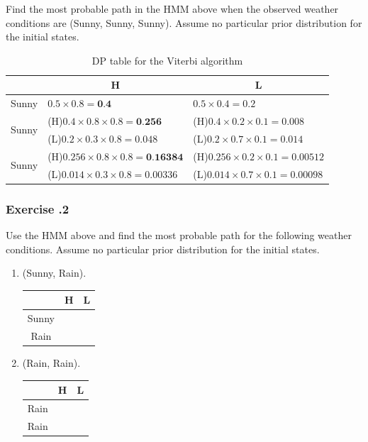 Find the most probable path in the HMM above when the observed weather conditions are (Sunny, Sunny, Sunny). Assume no particular prior distribution for the initial states.

\begin{table}[H]
\centering
\caption{DP table for the Viterbi algorithm}
\label{my-label}
\begin{tabular}{|c|l|l|}
\hline
                       & \multicolumn{1}{c|}{H}     & \multicolumn{1}{c|}{L}     \\ \hline
Sunny                  & $0.5 \times 0.8 = \textbf{0.4}$              & $0.5 \times 0.4 = 0.2$              \\ \hline
\multirow{2}{*}{Sunny} & (H)$0.4 \times 0.8 \times 0.8 = \textbf{0.256}$     & (H)$0.4 \times 0.2 \times 0.1 = 0.008$     \\
                       & (L)$0.2 \times 0.3 \times 0.8 = 0.048$     & (L)$0.2 \times 0.7 \times 0.1 = 0.014$     \\ \hline
\multirow{2}{*}{Sunny} & (H)$0.256 \times 0.8 \times 0.8 = \textbf{0.16384}$ & (H)$0.256 \times 0.2 \times 0.1= 0.00512$  \\
                       & (L)$0.014 \times 0.3 \times 0.8 = 0.00336$ & (L)$0.014 \times 0.7 \times 0.1 = 0.00098$ \\ \hline
\end{tabular}
\end{table}

%
%
\subsubsection*{Exercise \thesection.2}
Use the HMM above and find the most probable path for the following weather conditions. Assume no particular prior distribution for the initial states.

\begin{enumerate}
\item (Sunny, Rain).
\begin{table}[H]
\centering
\begin{tabular}{|c|c|c|}
\hline
      & H & L \\ \hline
Sunny & \quad \quad \quad \quad  \quad \quad \quad \quad &  \quad \quad \quad \quad \quad \quad \quad \quad \\ \hline
Rain  &   &    \\ \hline
\end{tabular}
\end{table}

\item (Rain, Rain).
\begin{table}[H]
\centering
\begin{tabular}{|c|c|c|}
\hline
      & H & L \\ \hline
Rain & \quad \quad \quad \quad  \quad \quad \quad \quad &  \quad \quad \quad \quad \quad \quad \quad \quad \\ \hline
Rain  &   &    \\ \hline
\end{tabular}
\end{table}

\end{enumerate}

\bigskip 

%
